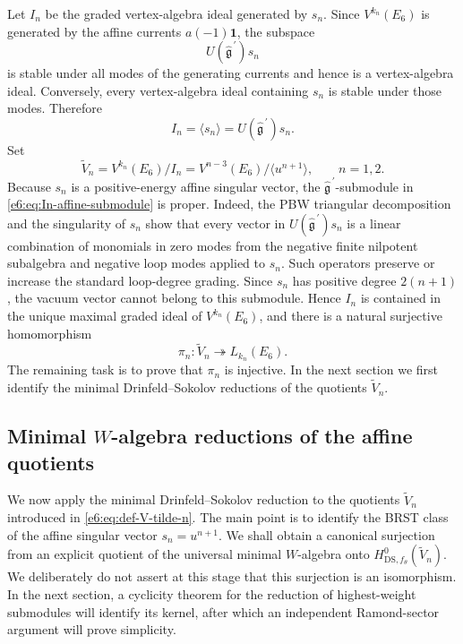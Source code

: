 \documentclass[11pt,reqno]{amsart}
\theoremstyle{definition}
\theoremstyle{remark}
\begin{document}
Let $I_n$ be the graded vertex-algebra ideal generated by $s_n$.  Since
$V^{k_n}(E_6)$ is generated by the affine currents $a(-1)\mathbf1$, the
subspace
\begin{equation*}
  U(\widehat{\mathfrak g}^{\,\prime})s_n
\end{equation*}
is stable under all modes of the generating currents and hence is a
vertex-algebra ideal.  Conversely, every vertex-algebra ideal containing $s_n$
is stable under those modes.  Therefore
\begin{equation}\label{e6:eq:In-affine-submodule}
  I_n
  =\langle s_n\rangle
  =U(\widehat{\mathfrak g}^{\,\prime})s_n.
\end{equation}
Set
\begin{equation}\label{e6:eq:def-V-tilde-n}
  \widetilde V_n
  =V^{k_n}(E_6)/I_n
  =V^{n-3}(E_6)/\langle u^{n+1}\rangle,
  \qquad n=1,2.
\end{equation}
Because $s_n$ is a positive-energy affine singular vector, the
$\widehat{\mathfrak g}^{\,\prime}$-submodule in
\eqref{e6:eq:In-affine-submodule} is proper.  Indeed, the PBW triangular
decomposition and the singularity of $s_n$ show that every vector in
$U(\widehat{\mathfrak g}^{\,\prime})s_n$ is a linear combination of
monomials in zero modes from the negative finite nilpotent subalgebra and
negative loop modes applied to $s_n$.  Such operators preserve or increase
the standard loop-degree grading.  Since $s_n$ has positive degree $2(n+1)$,
the vacuum vector cannot belong to this submodule.  Hence $I_n$ is contained
in the unique maximal graded ideal of $V^{k_n}(E_6)$, and there is a natural
surjective homomorphism
\begin{equation}\label{e6:eq:V-tilde-to-simple}
  \pi_n:\widetilde V_n\twoheadrightarrow L_{k_n}(E_6).
\end{equation}
The remaining task is to prove that $\pi_n$ is injective.  In the next section we
first identify the minimal Drinfeld--Sokolov reductions of the quotients
$\widetilde V_n$.

\subsection{Minimal \texorpdfstring{$W$}{W}-algebra reductions of the affine quotients}


We now apply the minimal Drinfeld--Sokolov reduction to the quotients
$\widetilde V_n$ introduced in \eqref{e6:eq:def-V-tilde-n}.  The main point is to
identify the BRST class of the affine singular vector $s_n=u^{n+1}$.  We shall
obtain a canonical surjection from an explicit quotient of the universal minimal
$W$-algebra onto $H^0_{\mathrm{DS},f_\theta}(\widetilde V_n)$.  We deliberately do not assert at this stage that this surjection is an
isomorphism.  In the next section, a cyclicity theorem for the reduction of
highest-weight submodules will identify its kernel, after which an independent
Ramond-sector argument will prove simplicity.
\end{document}
